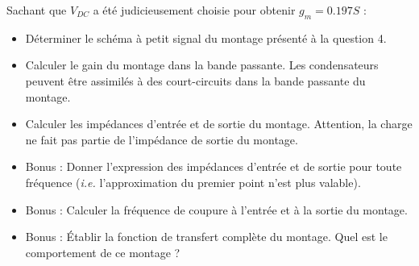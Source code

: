 \documentclass{../../template/tp}
\begin{document}
\Question
{
Sachant que $V_{DC}$ a été judicieusement choisie pour obtenir $g_m=0.197S$ :
 
 \begin{itemize}
 \item Déterminer le schéma à petit signal du montage présenté à la question 4.
 \item Calculer le gain du montage dans la bande passante. Les condensateurs peuvent être assimilés à des court-circuits dans la bande passante du montage.
 \item Calculer les impédances d'entrée et de sortie du montage. Attention, la charge ne fait pas partie de l'impédance de sortie du montage.
 \item Bonus : Donner l'expression des impédances d'entrée et de sortie pour toute fréquence (\textit{i.e.} l'approximation du premier point n'est plus valable).
 \item Bonus : Calculer la fréquence de coupure à l'entrée et à la sortie du montage.
 \item Bonus : Établir la fonction de transfert complète du montage. Quel est le comportement de ce montage ?
 \end{itemize}

}
\end{document}
